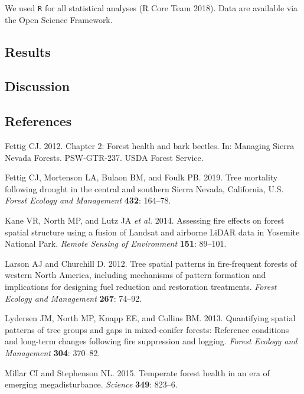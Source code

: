 \documentclass[]{article}
\begin{document}
We used \texttt{R} for all statistical analyses (R Core Team 2018). Data
are available via the Open Science Framework.

\subsection{Results}\label{results}

\subsection{Discussion}\label{discussion}

\subsection*{References}\label{references}

\hypertarget{refs}{}
\hypertarget{ref-fettig2012b}{}
Fettig CJ. 2012. Chapter 2: Forest health and bark beetles. In: Managing
Sierra Nevada Forests. PSW-GTR-237. USDA Forest Service.

\hypertarget{ref-fettig2019}{}
Fettig CJ, Mortenson LA, Bulaon BM, and Foulk PB. 2019. Tree mortality
following drought in the central and southern Sierra Nevada, California,
U.S. \emph{Forest Ecology and Management} \textbf{432}: 164--78.

\hypertarget{ref-kane2014}{}
Kane VR, North MP, and Lutz JA \emph{et al.} 2014. Assessing fire
effects on forest spatial structure using a fusion of Landsat and
airborne LiDAR data in Yosemite National Park. \emph{Remote Sensing of
Environment} \textbf{151}: 89--101.

\hypertarget{ref-larson2012}{}
Larson AJ and Churchill D. 2012. Tree spatial patterns in fire-frequent
forests of western North America, including mechanisms of pattern
formation and implications for designing fuel reduction and restoration
treatments. \emph{Forest Ecology and Management} \textbf{267}: 74--92.

\hypertarget{ref-lydersen2013}{}
Lydersen JM, North MP, Knapp EE, and Collins BM. 2013. Quantifying
spatial patterns of tree groups and gaps in mixed-conifer forests:
Reference conditions and long-term changes following fire suppression
and logging. \emph{Forest Ecology and Management} \textbf{304}: 370--82.

\hypertarget{ref-millar2015}{}
Millar CI and Stephenson NL. 2015. Temperate forest health in an era of
emerging megadisturbance. \emph{Science} \textbf{349}: 823--6.
\end{document}
